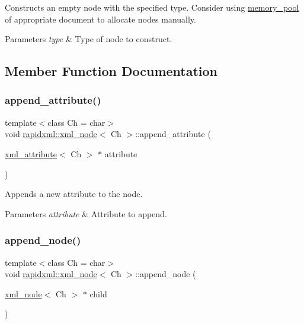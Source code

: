 Constructs an empty node with the specified type. Consider using \hyperlink{classrapidxml_1_1memory__pool}{memory\+\_\+pool} of appropriate document to allocate nodes manually. 
\begin{DoxyParams}{Parameters}
{\em type} & Type of node to construct. \\
\hline
\end{DoxyParams}


\subsection{Member Function Documentation}
\mbox{\label{classrapidxml_1_1xml__node_a33ce3386f8c42dd4db658b75cbb6e6c4}} 
\subsubsection{\texorpdfstring{append\+\_\+attribute()}{append\_attribute()}}
{\footnotesize\ttfamily template$<$class Ch = char$>$ \\
void \hyperlink{classrapidxml_1_1xml__node}{rapidxml\+::xml\+\_\+node}$<$ Ch $>$\+::append\+\_\+attribute (\begin{DoxyParamCaption}\item[{\hyperlink{classrapidxml_1_1xml__attribute}{xml\+\_\+attribute}$<$ Ch $>$ $\ast$}]{attribute }\end{DoxyParamCaption})\hspace{0.3cm}{\ttfamily [inline]}}

Appends a new attribute to the node. 
\begin{DoxyParams}{Parameters}
{\em attribute} & Attribute to append. \\
\hline
\end{DoxyParams}
\mbox{\label{classrapidxml_1_1xml__node_a8696d098ecc9c4d2a646b43e91d58e31}} 
\subsubsection{\texorpdfstring{append\+\_\+node()}{append\_node()}}
{\footnotesize\ttfamily template$<$class Ch = char$>$ \\
void \hyperlink{classrapidxml_1_1xml__node}{rapidxml\+::xml\+\_\+node}$<$ Ch $>$\+::append\+\_\+node (\begin{DoxyParamCaption}\item[{\hyperlink{classrapidxml_1_1xml__node}{xml\+\_\+node}$<$ Ch $>$ $\ast$}]{child }\end{DoxyParamCaption})\hspace{0.3cm}{\ttfamily [inline]}}

